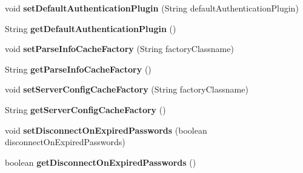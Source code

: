 \begin{DoxyCompactItemize}
void {\bfseries set\+Default\+Authentication\+Plugin} (String default\+Authentication\+Plugin)
\item 
\mbox{\label{interfacecom_1_1mysql_1_1jdbc_1_1_connection_properties_a90c84d6cebf2c2f5004deb2a18ce3ca6}} 
String {\bfseries get\+Default\+Authentication\+Plugin} ()
\item 
\mbox{\label{interfacecom_1_1mysql_1_1jdbc_1_1_connection_properties_ab98ef0328517819eb41692ea7dda8e63}} 
void {\bfseries set\+Parse\+Info\+Cache\+Factory} (String factory\+Classname)
\item 
\mbox{\label{interfacecom_1_1mysql_1_1jdbc_1_1_connection_properties_a4c5bb19d0681015636256ac1cad2b7aa}} 
String {\bfseries get\+Parse\+Info\+Cache\+Factory} ()
\item 
\mbox{\label{interfacecom_1_1mysql_1_1jdbc_1_1_connection_properties_aa1e611916792c34b5e509088a5f23985}} 
void {\bfseries set\+Server\+Config\+Cache\+Factory} (String factory\+Classname)
\item 
\mbox{\label{interfacecom_1_1mysql_1_1jdbc_1_1_connection_properties_a5d28377dea03bffaa72ca98d3dd050df}} 
String {\bfseries get\+Server\+Config\+Cache\+Factory} ()
\item 
\mbox{\label{interfacecom_1_1mysql_1_1jdbc_1_1_connection_properties_a4f6663296b5d7ab1e30153639a4ee6dc}} 
void {\bfseries set\+Disconnect\+On\+Expired\+Passwords} (boolean disconnect\+On\+Expired\+Passwords)
\item 
\mbox{\label{interfacecom_1_1mysql_1_1jdbc_1_1_connection_properties_abcce68eb966ef59fddbd44c326b75074}} 
boolean {\bfseries get\+Disconnect\+On\+Expired\+Passwords} ()
\item 
\mbox{\label{interfacecom_1_1mysql_1_1jdbc_1_1_connection_properties_ada58e5fc985e0ab8ca6f178d86f1622c}} 

\end{DoxyCompactItemize}
